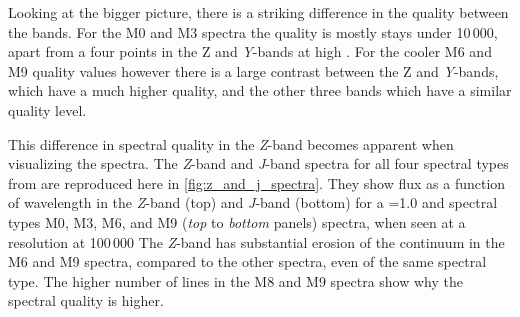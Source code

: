 Looking at the bigger picture, there is a striking difference in the quality between the bands. For the {M0} and {M3} spectra the quality is mostly stays under 10\,000, apart from a four points in the Z and \emph{Y}-bands at high \feh{}. For the cooler {M6} and {M9} quality values however there is a large contrast between the Z and \emph{Y}-bands, which have a much higher quality, and the other three bands which have a similar quality level.

This difference in spectral quality in the \emph{Z}-band becomes apparent when visualizing the spectra. The \emph{Z}-band and \emph{J}-band spectra for all four spectral types from \citet{figueira_radial_2016} are reproduced here in \cref{fig:z_and_j_spectra}. They show flux as a function of wavelength in the \emph{Z}-band (top) and \emph{J}-band (bottom) for a \Vsini{}=1.0\kmps{} and spectral types {M0}, {M3}, {M6}, and {M9} (\textit{top} to \textit{bottom} panels) spectra, when seen at a resolution at 100\,000
The \emph{Z}-band has substantial erosion of the continuum in the {M6} and {M9} spectra, compared to the other spectra, even of the same spectral type. The higher number of lines in the M8 and {M9} spectra show why the spectral quality is higher.

